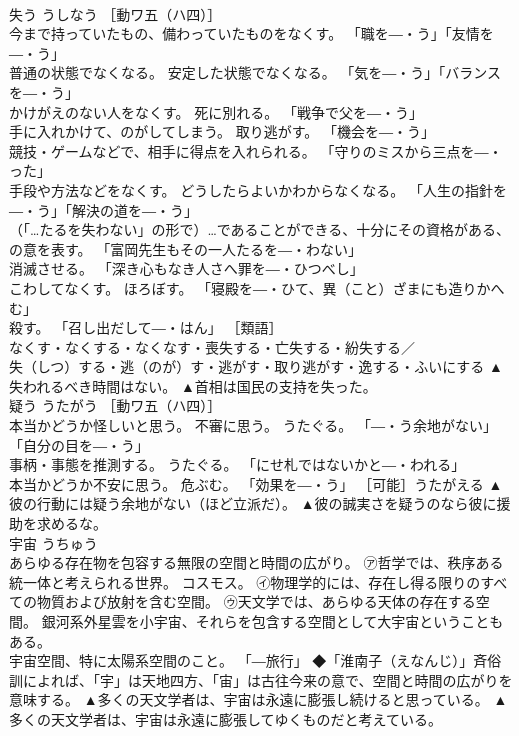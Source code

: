 \documentclass[8pt]{extreport}
\begin{document}
\begin{CJK}{UTF8}{min}
\\	失う	うしなう	［動ワ五（ハ四）］ 
\\	今まで持っていたもの、備わっていたものをなくす。 「職を―・う」「友情を―・う」 
\\	普通の状態でなくなる。 安定した状態でなくなる。 「気を―・う」「バランスを―・う」 
\\	かけがえのない人をなくす。 死に別れる。 「戦争で父を―・う」 
\\	手に入れかけて、のがしてしまう。 取り逃がす。 「機会を―・う」 
\\	競技・ゲームなどで、相手に得点を入れられる。 「守りのミスから三点を―・った」 
\\	手段や方法などをなくす。 どうしたらよいかわからなくなる。 「人生の指針を―・う」「解決の道を―・う」 
\\	（「…たるを失わない」の形で）…であることができる、十分にその資格がある、の意を表す。 「富岡先生もその一人たるを―・わない」 
\\	消滅させる。 「深き心もなき人さへ罪を―・ひつべし」 
\\	こわしてなくす。 ほろぼす。 「寝殿を―・ひて、異（こと）ざまにも造りかへむ」 
\\	殺す。 「召し出だして―・はん」 ［類語］
\\	なくす・なくする・なくなす・喪失する・亡失する・紛失する／
\\	失（しつ）する・逃（のが）す・逃がす・取り逃がす・逸する・ふいにする	▲失われるべき時間はない。 ▲首相は国民の支持を失った。
\\	疑う	うたがう	［動ワ五（ハ四）］ 
\\	本当かどうか怪しいと思う。 不審に思う。 うたぐる。 「―・う余地がない」「自分の目を―・う」 
\\	事柄・事態を推測する。 うたぐる。 「にせ札ではないかと―・われる」 
\\	本当かどうか不安に思う。 危ぶむ。 「効果を―・う」 ［可能］うたがえる	▲彼の行動には疑う余地がない（ほど立派だ）。 ▲彼の誠実さを疑うのなら彼に援助を求めるな。
\\	宇宙	うちゅう	
\\	あらゆる存在物を包容する無限の空間と時間の広がり。 ㋐哲学では、秩序ある統一体と考えられる世界。 コスモス。 ㋑物理学的には、存在し得る限りのすべての物質および放射を含む空間。 ㋒天文学では、あらゆる天体の存在する空間。 銀河系外星雲を小宇宙、それらを包含する空間として大宇宙ということもある。 
\\	宇宙空間、特に太陽系空間のこと。 「―旅行」 ◆「淮南子（えなんじ）」斉俗訓によれば、「宇」は天地四方、「宙」は古往今来の意で、空間と時間の広がりを意味する。	▲多くの天文学者は、宇宙は永遠に膨張し続けると思っている。 ▲多くの天文学者は、宇宙は永遠に膨張してゆくものだと考えている。

\end{CJK}
\end{document}
